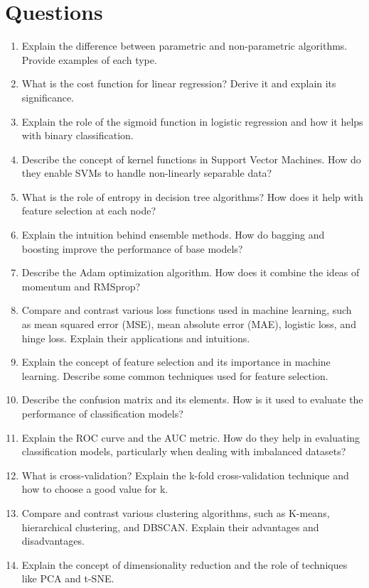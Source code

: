 \documentclass[12pt]{article}
\begin{document}
\section{Questions}
\begin{enumerate}
  \item Explain the difference between parametric and non-parametric algorithms. Provide examples of each type.
  \item What is the cost function for linear regression? Derive it and explain its significance.
  \item Explain the role of the sigmoid function in logistic regression and how it helps with binary classification.
  \item Describe the concept of kernel functions in Support Vector Machines. How do they enable SVMs to handle non-linearly separable data?
  \item What is the role of entropy in decision tree algorithms? How does it help with feature selection at each node?
  \item Explain the intuition behind ensemble methods. How do bagging and boosting improve the performance of base models?
  \item Describe the Adam optimization algorithm. How does it combine the ideas of momentum and RMSprop?
  \item Compare and contrast various loss functions used in machine learning, such as mean squared error (MSE), mean absolute error (MAE), logistic loss, and hinge loss. Explain their applications and intuitions.
  \item Explain the concept of feature selection and its importance in machine learning. Describe some common techniques used for feature selection.
  \item Describe the confusion matrix and its elements. How is it used to evaluate the performance of classification models?
  \item Explain the ROC curve and the AUC metric. How do they help in evaluating classification models, particularly when dealing with imbalanced datasets?
  \item What is cross-validation? Explain the k-fold cross-validation technique and how to choose a good value for k.
  \item Compare and contrast various clustering algorithms, such as K-means, hierarchical clustering, and DBSCAN. Explain their advantages and disadvantages.
  \item Explain the concept of dimensionality reduction and the role of techniques like PCA and t-SNE.

\end{enumerate}
\end{document}

